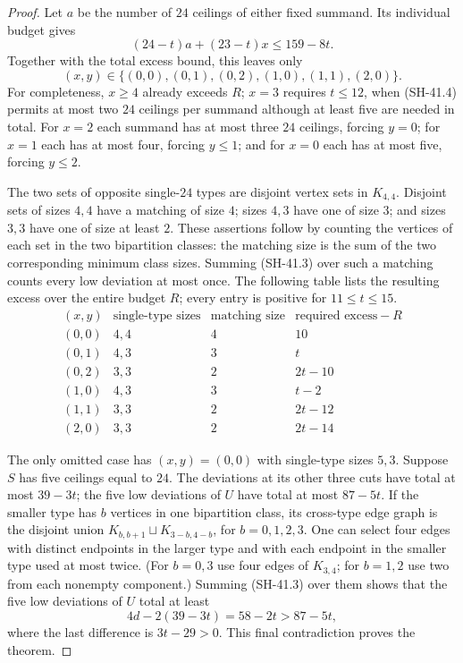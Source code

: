 \begin{proof}
Let $a$ be the number of $24$ ceilings of either
fixed summand.  Its individual budget gives
\[
 (24-t)a+(23-t)x\le159-8t.                    \tag{SH-41.4}
\]
Together with the total excess bound, this leaves
only
\[
 (x,y)\in\{(0,0),(0,1),(0,2),
                 (1,0),(1,1),(2,0)\}.
\]
For completeness, $x\ge4$ already exceeds $R$;
$x=3$ requires $t\le12$, when (SH-41.4) permits
at most two $24$ ceilings per summand although at
least five are needed in total.  For $x=2$ each
summand has at most three $24$ ceilings, forcing
$y=0$; for $x=1$ each has at most four, forcing
$y\le1$; and for $x=0$ each has at most five,
forcing $y\le2$.

The two sets of opposite single-$24$ types are
disjoint vertex sets in $K_{4,4}$.  Disjoint sets
of sizes $4,4$ have a matching of size $4$; sizes
$4,3$ have one of size $3$; and sizes $3,3$ have
one of size at least $2$.  These assertions follow
by counting the vertices of each set in the two
bipartition classes: the matching size is the sum
of the two corresponding minimum class sizes.
Summing (SH-41.3) over such a matching counts every
low deviation at most once.  The following table
lists the resulting excess over the entire budget
$R$; every entry is positive for $11\le t\le15$.
\[
\begin{array}{c|c|c|c}
(x,y)&\text{single-type sizes}&\text{matching size}
 &\text{required excess}-R\\\hline
(0,0)&4,4&4&10\\
(0,1)&4,3&3&t\\
(0,2)&3,3&2&2t-10\\
(1,0)&4,3&3&t-2\\
(1,1)&3,3&2&2t-12\\
(2,0)&3,3&2&2t-14
\end{array}
\]

The only omitted case has $(x,y)=(0,0)$ with
single-type sizes $5,3$.  Suppose $S$ has five
ceilings equal to $24$.  The deviations at its
other three cuts have total at most $39-3t$;
the five low deviations of $U$ have total at most
$87-5t$.  If the smaller type has $b$ vertices in
one bipartition class, its cross-type edge graph
is the disjoint union
$K_{b,b+1}\sqcup K_{3-b,4-b}$, for $b=0,1,2,3$.
One can select four edges with distinct endpoints
in the larger type and with each endpoint in the
smaller type used at most twice.  (For $b=0,3$
use four edges of $K_{3,4}$; for $b=1,2$ use two
from each nonempty component.)  Summing (SH-41.3)
over them shows that the five low deviations of
$U$ total at least
\[
 4d-2(39-3t)=58-2t>87-5t,
\]
where the last difference is $3t-29>0$.
This final contradiction proves the theorem.
\end{proof}


